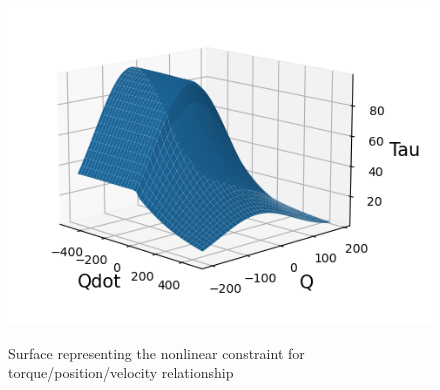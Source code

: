 \begin{figure}[h!]
\includegraphics[width=\columnwidth]{figures/graph_force_vitesse_longueur.png}\\
\caption{Surface representing the nonlinear constraint for torque/position/velocity relationship}
\label{fig:graph_force_vitesse_longueur}
\end{figure}